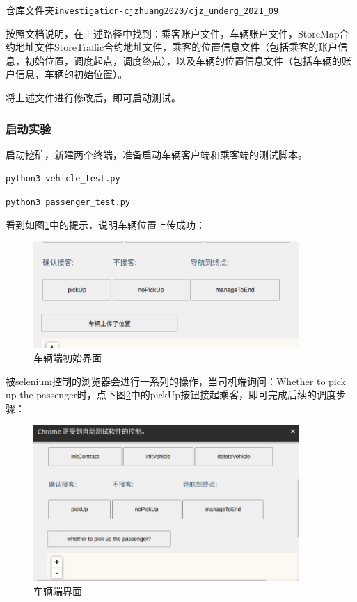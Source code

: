 仓库文件夹\verb|investigation-cjzhuang2020/cjz_underg_2021_09|

按照文档说明，在上述路径中找到：乘客账户文件，车辆账户文件，StoreMap合约地址文件StoreTraffic合约地址文件，乘客的位置信息文件（包括乘客的账户信息，初始位置，调度起点，调度终点），以及车辆的位置信息文件（包括车辆的账户信息，车辆的初始位置）。

将上述文件进行修改后，即可启动测试。

\subsubsection{启动实验}

启动挖矿，新建两个终端，准备启动车辆客户端和乘客端的测试脚本。

\verb|python3 vehicle_test.py|

\verb|python3 passenger_test.py|

看到如图\ref{fig:车辆端初始界面}中的提示，说明车辆位置上传成功：

\begin{figure}
	\centering
	\includegraphics[width=0.9\textwidth]{figures/车辆端初始界面.png}
	\caption{车辆端初始界面}
	\label{fig:车辆端初始界面}
\end{figure}

被selenium控制的浏览器会进行一系列的操作，当司机端询问：Whether to pick up the passenger时，点下图\ref{fig:车辆端界面}中的pickUp按钮接起乘客，即可完成后续的调度步骤：

\begin{figure}
	\centering
	\includegraphics[width=0.9\textwidth]{figures/车辆端界面.png}
	\caption{车辆端界面}
	\label{fig:车辆端界面}
\end{figure}

